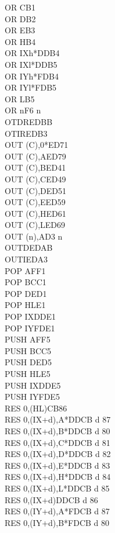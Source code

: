 \documentclass[oneside,a4paper]{book}
\begin{document}
\begin{multicols}{3}
{\begin{tabbing}
OR C\>B1\\
OR D\>B2\\
OR E\>B3\\
OR H\>B4\\
OR IXh*\>DDB4\\
OR IXl*\>DDB5\\
OR IYh*\>FDB4\\
OR IYl*\>FDB5\\
OR L\>B5\\
OR n\>F6 n\\
OTDR\>EDBB\\
OTIR\>EDB3\\
OUT (C),0*\>ED71\\
OUT (C),A\>ED79\\
OUT (C),B\>ED41\\
OUT (C),C\>ED49\\
OUT (C),D\>ED51\\
OUT (C),E\>ED59\\
OUT (C),H\>ED61\\
OUT (C),L\>ED69\\
OUT (n),A\>D3 n\\
OUTD\>EDAB\\
OUTI\>EDA3\\
POP AF\>F1\\
POP BC\>C1\\
POP DE\>D1\\
POP HL\>E1\\
POP IX\>DDE1\\
POP IY\>FDE1\\
PUSH AF\>F5\\
PUSH BC\>C5\\
PUSH DE\>D5\\
PUSH HL\>E5\\
PUSH IX\>DDE5\\
PUSH IY\>FDE5\\
RES 0,(HL)\>CB86\\
RES 0,(IX+d),A*\>DDCB d 87\\
RES 0,(IX+d),B*\>DDCB d 80\\
RES 0,(IX+d),C*\>DDCB d 81\\
RES 0,(IX+d),D*\>DDCB d 82\\
RES 0,(IX+d),E*\>DDCB d 83\\
RES 0,(IX+d),H*\>DDCB d 84\\
RES 0,(IX+d),L*\>DDCB d 85\\
RES 0,(IX+d)\>DDCB d 86\\
RES 0,(IY+d),A*\>FDCB d 87\\
RES 0,(IY+d),B*\>FDCB d 80\\

\end{tabbing}}
\end{multicols}
\end{document}
